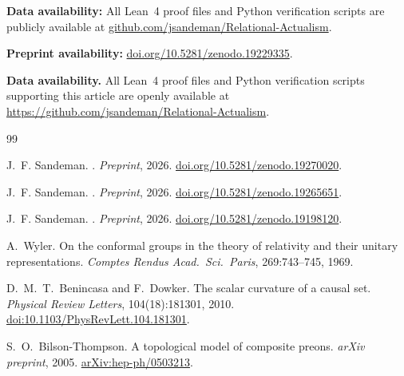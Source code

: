 \documentclass[11pt,a4paper]{article}
\begin{document}
\textbf{Data availability:} All Lean~4 proof files and Python verification scripts are publicly available at \href{https://github.com/jsandeman/Relational-Actualism}{github.com/jsandeman/Relational-Actualism}.

\textbf{Preprint availability:} \href{https://doi.org/10.5281/zenodo.19229335}{doi.org/10.5281/zenodo.19229335}.


\smallskip\noindent
\textbf{Data availability.}
All Lean~4 proof files and Python verification scripts supporting this
article are openly available at
\url{https://github.com/jsandeman/Relational-Actualism}.

\begin{thebibliography}{99}

J.~F. Sandeman.
.
\newblock \textit{Preprint}, 2026.
\newblock \href{https://doi.org/10.5281/zenodo.19270020}{doi.org/10.5281/zenodo.19270020}.


J.~F. Sandeman.
.
\newblock \textit{Preprint}, 2026.
\newblock \href{https://doi.org/10.5281/zenodo.19265651}{doi.org/10.5281/zenodo.19265651}.

J.~F. Sandeman.
.
\newblock \textit{Preprint}, 2026.
\newblock \href{https://doi.org/10.5281/zenodo.19198120}{doi.org/10.5281/zenodo.19198120}.


A.~Wyler.
\newblock On the conformal groups in the theory of relativity and their
  unitary representations.
\newblock \emph{Comptes Rendus Acad.~Sci.~Paris}, 269:743--745, 1969.

D.~M.~T.~Benincasa and F.~Dowker.
\newblock The scalar curvature of a causal set.
\newblock \emph{Physical Review Letters}, 104(18):181301, 2010.
\newblock \href{https://doi.org/10.1103/PhysRevLett.104.181301}{doi:10.1103/PhysRevLett.104.181301}.

S.~O.~Bilson-Thompson.
\newblock A topological model of composite preons.
\newblock \emph{arXiv preprint}, 2005.
\newblock \href{https://arxiv.org/abs/hep-ph/0503213}{arXiv:hep-ph/0503213}.


\end{thebibliography}
\end{document}
